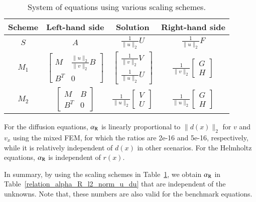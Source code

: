 \documentclass[review,3p]{elsarticle}
\begin{document}
\begin{table}[!ht]
\centering
\caption [sss] {System of equations using various scaling schemes.}
\label{scaling_schemes_std_and_mix_FEM} 
\begin{tabular}{c c c c}
\hline  
{Scheme}& Left-hand side & Solution & Right-hand side \\	\hline
$S$ & {$A$} & $\frac{1}{\|u\|_{2}} U$ & $\frac{1}{\|u\|_{2}} F$ \\	\hline
$M_1$ & {$\left[ \begin{array}{cc} M & \frac{\|u\|_{2}}{\|v\|_{2}} B  \\ B^T & 0 \end{array}\right]$ } & $\left[ \begin{array}{cc} \frac{1}{\|v\|_{2}} {V} \\ \frac{1}{\|u\|_{2}} {U} \end{array}\right]$ & $\frac{1}{\|v\|_{2}}\left[ \begin{array}{cc} G \\ { H} \end{array}\right]$\\	\hline
$M_2$ & {$\left[ \begin{array}{cc} M & B  \\ B^T & 0 \end{array}\right]$ } & $\frac{1}{\|u\|_{2}} \left[ \begin{array}{cc} {V} \\ {U} \end{array}\right]$ & $\frac{1}{\|u\|_{2}} \left[ \begin{array}{cc}  G \\ H \end{array}\right]$ \\	\hline
\end{tabular}
\end{table}


For the diffusion equations, $\alpha_{\rm R}$ is linearly proportional to $\|d(x)\|_2$ for $v$ and $v_x$ using the mixed FEM, for which the ratios are 2e-16 and 5e-16, respectively, while it is relatively independent of $d(x)$ in other scenarios. For the Helmholtz equations, $\alpha_{\rm R}$ is independent of $r(x)$.

\newpage
In summary, by using the scaling schemes in Table~\ref{scaling_schemes_std_and_mix_FEM}, we obtain $\alpha_{\rm R}$ in Table~\ref{relation_alpha_R_l2_norm_u_du} that are independent of the unknowns. Note that, these numbers are also valid for the benchmark equations.
\end{document}
